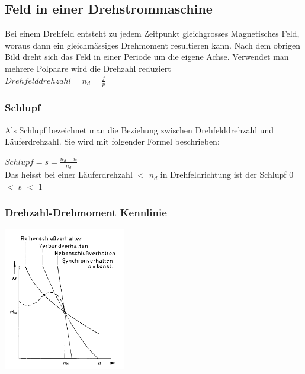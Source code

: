     \subsection{Feld in einer Drehstrommaschine}
        \begin{minipage}{7cm}
        \end{minipage}
        \begin{minipage}{11cm}
            Bei einem Drehfeld entsteht zu jedem Zeitpunkt gleichgrosses Magnetisches Feld, woraus dann ein gleichmässiges Drehmoment resultieren kann. Nach dem obrigen Bild dreht sich das Feld in einer Periode um die eigene Achse. Verwendet man mehrere Polpaare wird die Drehzahl reduziert \\
            $Drehfelddrehzahl  = n_d =\frac{f}{p}$ \\
        \end{minipage}

    \subsubsection{Schlupf}
        Als Schlupf bezeichnet man die Beziehung zwischen Drehfelddrehzahl und Läuferdrehzahl. Sie wird mit folgender Formel beschrieben: \\
        \begin{multicols}{2}
            $Schlupf = s = \frac{n_d - n}{n_d}$ \\
            Das heisst bei einer Läuferdrehzahl $<$ $n_d$ in Drehfeldrichtung ist der Schlupf 0 $<$ s $<$ 1
        \columnbreak
        
        \end{multicols}
        
	\subsubsection{Drehzahl-Drehmoment Kennlinie}
		\begin{center}
			\includegraphics[width=0.4\textwidth]{images/Mn-Kennlinien.png}
		\end{center}        
    \newpage